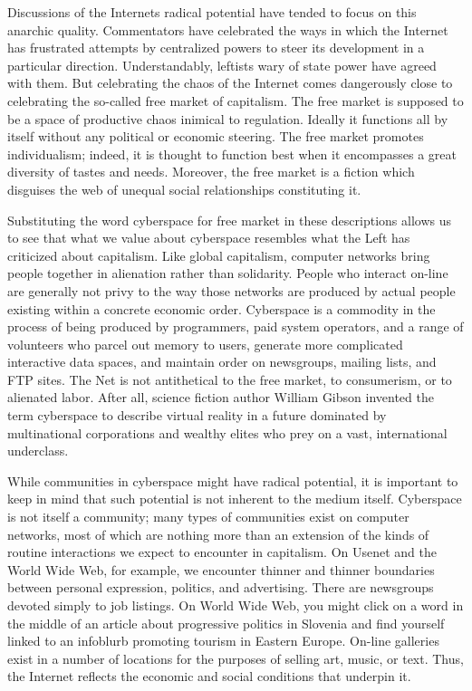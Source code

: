 \documentclass[letterpaper,12pt,english]{sphinxmanual}
\begin{document}
Discussions of the Internets radical potential have tended to focus on this anarchic quality. Commentators have celebrated the ways in which the Internet has frustrated attempts by centralized powers to steer its development in a particular direction. Understandably, leftists wary of state power have agreed with them. But celebrating the chaos of the Internet comes dangerously close to celebrating the so-called free market of capitalism. The free market is supposed to be a space of productive chaos inimical to regulation. Ideally it functions all by itself without any political or economic steering. The free market promotes individualism; indeed, it is thought to function best when it encompasses a great diversity of tastes and needs. Moreover, the free market is a fiction which disguises the web of unequal social relationships constituting it.

Substituting the word cyberspace for free market in these descriptions allows us to see that what we value about cyberspace resembles what the Left has criticized about capitalism. Like global capitalism, computer networks bring people together in alienation rather than solidarity. People who interact on-line are generally not privy to the way those networks are produced by actual people existing within a concrete economic order. Cyberspace is a commodity in the process of being produced by programmers, paid system operators, and a range of volunteers who parcel out memory to users, generate more complicated interactive data spaces, and maintain order on newsgroups, mailing lists, and FTP sites. The Net is not antithetical to the free market, to consumerism, or to alienated labor. After all, science fiction author William Gibson invented the term cyberspace to describe virtual reality in a future dominated by multinational corporations and wealthy elites who prey on a vast, international underclass.

While communities in cyberspace might have radical potential, it is important to keep in mind that such potential is not inherent to the medium itself. Cyberspace is not itself a community; many types of communities exist on computer networks, most of which are nothing more than an extension of the kinds of routine interactions we expect to encounter in capitalism. On Usenet and the World Wide Web, for example, we encounter thinner and thinner boundaries between personal expression, politics, and advertising. There are newsgroups devoted simply to job listings. On World Wide Web, you might click on a word in the middle of an article about progressive politics in Slovenia and find yourself linked to an infoblurb promoting tourism in Eastern Europe. On-line galleries exist in a number of locations for the purposes of selling art, music, or text. Thus, the Internet reflects the economic and social conditions that underpin it.
\end{document}
